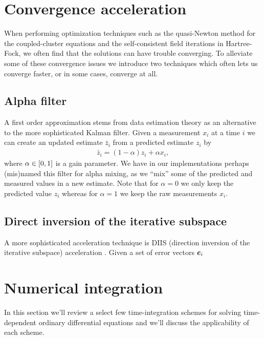     \section{Convergence acceleration}
        When performing optimization techniques such as the quasi-Newton method
        for the coupled-cluster equations and the self-consistent field
        iterations in Hartree-Fock, we often find that the solutions can have
        trouble converging.
        To alleviate some of these convergence issues we introduce two
        techniques which often lets us converge faster, or in some cases,
        converge at all.

        \subsection{Alpha filter}
            A first order approximation stems from data estimation theory as an
            alternative to the more sophisticated Kalman filter.
            Given a measurement $x_i$ at a time $i$ we can create an updated
            estimate $\bar{z}_i$ from a predicted estimate $z_i$ by
            \begin{align}
                \bar{z}_i = (1 - \alpha) z_i + \alpha x_i,
            \end{align}
            where $\alpha \in \left[ 0, 1 \right]$ is a gain parameter.
            We have in our implementations perhaps (mis)named this filter for
            alpha mixing, as we ``mix'' some of the predicted and measured
            values in a new estimate.
            Note that for $\alpha = 0$ we only keep the predicted value $z_i$
            whereas for $\alpha = 1$ we keep the raw measurements $x_i$.

        \subsection{Direct inversion of the iterative subspace}
            A more sophisticated acceleration technique is DIIS (direction
            inversion of the iterative subspace) acceleration
            \cite{pulay1980393, helgaker-molecular}.
            Given a set of error vectors $\boldsymbol{e}_i$

    \section{Numerical integration}
        \label{sec:numerical-integration}
        In this section we'll review a select few time-integration schemes for
        solving time-dependent ordinary differential equations and we'll discuss the
        applicability of each scheme.

